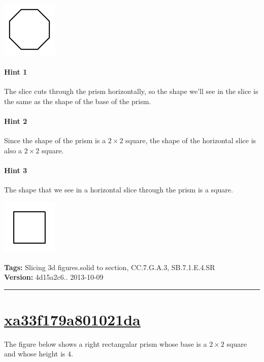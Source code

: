 \documentclass[twocolumn,10pt]{article}
\def\shrinkfactor{0.4}
\begin{document}
\includegraphics[scale=\shrinkfactor]{figures/7d98a99c75a84da8f748444ad7a3a8053be16a27.png}



\paragraph{Hint 1}The slice cuts through the prism horizontally, so the shape we'll see in the slice is the same as the shape of the base of the prism.

\paragraph{Hint 2}Since the shape of the prism is a $2 \times 2$ square, the shape of the horizontal slice is also a $2 \times 2$ square.

\paragraph{Hint 3}The shape that we see in a horizontal slice through the prism is a square.  

\includegraphics[scale=\shrinkfactor]{figures/4b59a0ece6acc7c19c389e1de534d1df93bf1169.png}



\medskip
\noindent
\textbf{Tags:} {\footnotesize Slicing 3d figures.solid to section, CC.7.G.A.3, SB.7.1.E.4.SR}\\
\textbf{Version:} 4d15a2c6.. 2013-10-09
\smallskip\hrule





\section{\href{https://www.khanacademy.org/devadmin/content/items/xa33f179a801021da}{xa33f179a801021da}}

\noindent
The figure below shows a right rectangular prism whose base is a $2 \times 2$ square and whose height is $4$. 
\end{document}
